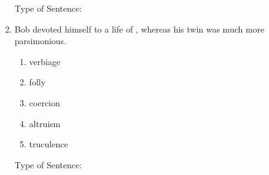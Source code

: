 \begin{enumerate}
Type of Sentence:\hrulefill

\bigskip
\item Bob devoted himself to a life of \longline, whereas his twin was much more parsimonious. 
\begin{enumerate}[label=(\Alph*)]
\item verbiage
\item folly
\item coercion
\item altruism 
\item truculence
\end{enumerate}

Type of Sentence:\hrulefill
\end{enumerate}